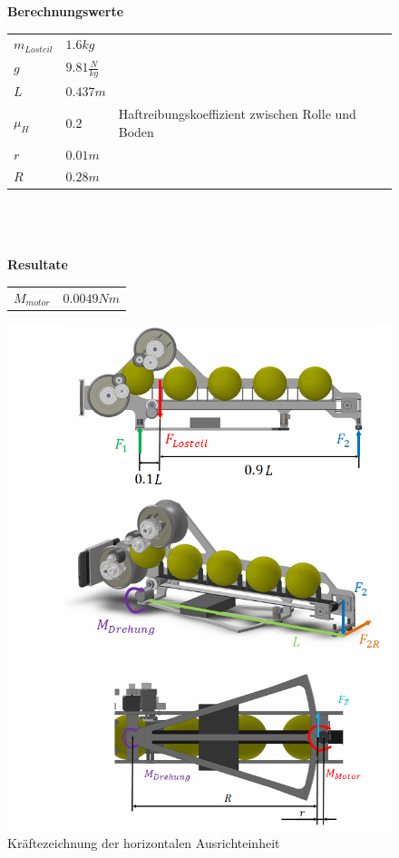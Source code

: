 \begin{figure}[h!]
\begin{minipage}[hbt]{0.5\textwidth}
    	\textbf{Berechnungswerte}\\
    	\begin{tabular}{llp{4cm}}
    		\rule{0pt}{11pt} $m_{Losteil}$ & $1.6 kg$ & \\
    		\rule{0pt}{11pt} $g$ & $9.81 \frac{N}{kg}$ & \\
    		\rule{0pt}{11pt} $L$ & $0.437 m$ &  \\
    		\rule{0pt}{11pt} $\mu_H$ & $0.2$ & Haftreibungskoeffizient zwischen Rolle und Boden \\
    		\rule{0pt}{11pt} $r$ & $0.01 m$ & \\
    		\rule{0pt}{11pt} $R$ & $0.28 m$ & \\
    	\end{tabular}\\
    	\\
    	\\
    	\textbf{Resultate}\\
    	\begin{tabular}{ll}
    		\rule{0pt}{11pt} $M_{motor}$ & $0.0049Nm$ \\
    	\end{tabular}
    \end{minipage}
\hfill
    \begin{minipage}[hbt]{0.5\textwidth}
    	\centering
    	\includegraphics[width=1\textwidth,clip,trim=3cm 0cm 0cm 0cm]
    	{Enddokumentation/Anhang/Bilder/NotizBerechnungDrehmomentStepper.jpg}
    	\caption{Kräftezeichnung der horizontalen Ausrichteinheit}
    	\label{fig:ErklaerungStepper}
    \end{minipage}
\end{figure}
